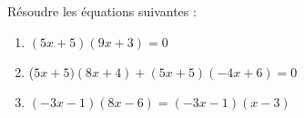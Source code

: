 \documentclass[a4paper,11pt,exos]{nsi} %
\begin{document}
\maketitle




\begin{exercice}
    Résoudre les équations suivantes :
        \begin{enumerate}
            \item $(5x+5)(9x+3)=0$
            \item ($5x+5)( 8x+4)+(5x+5)(-4x+6)=0$
	        \item $(-3x-1)(8x-6)=(-3x-1)(x-3)$
        \end{enumerate}
    
\end{exercice}
\end{document}

